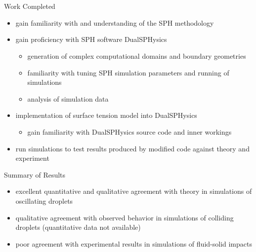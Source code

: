 \section{\thesec}
\label{sec:results}

\begin{frame}{Work Completed}{}
  \vspace*{-2\baselineskip}
  \begin{itemize}
    \item{
      gain familiarity with and understanding of the SPH methodology
    }
    \item{
      gain proficiency with SPH software DualSPHysics
      \begin{itemize}
          \item{
            generation of complex computational domains and boundary geometries
          }
          \item{
            familiarity with tuning SPH simulation parameters and running of simulations
          }
          \item{
            analysis of simulation data
          }
      \end{itemize}
    }
    \item{
      implementation of surface tension model into DualSPHysics
      \begin{itemize}
        \item{
          gain familiarity with DualSPHysics source code and inner workings
        }
      \end{itemize}
    }
    \item{
      run simulations to test results produced by modified code against theory and experiment
    }
  \end{itemize}
\end{frame}

\begin{frame}{\thesec}{Summary of Results}
  \vspace*{-2\baselineskip}
  \begin{itemize}
    \item{
      excellent quantitative and qualitative agreement with theory in simulations of oscillating droplets
    }
    \vspace*{\baselineskip}
    \item{
      qualitative agreement with observed behavior in simulations of colliding droplets (quantitative data not available)
    }
    \vspace*{\baselineskip}
    \item{
      \alert{poor agreement with experimental results in simulations of fluid-solid impacts}
    }
  \end{itemize}
\end{frame}

